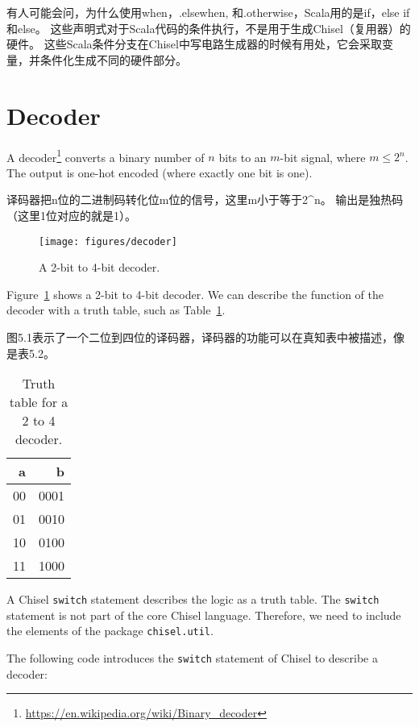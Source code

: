 \documentclass[%
    10pt,
    headinclude, footexclude,
    openright, %
    notitlepage,
    cleardoubleempty,
    headsepline,
    pointlessnumbers,
    bibtotoc, idxtotoc,
    ]{scrbook}
\newcommand{\code}[1]{{\small{\texttt{#1}}}}
\newcommand{\scale}{0.7}
\newcommand{\myref}[2]{\href{#1}{#2}}
\renewcommand{\myref}[2]{{#2}{\footnote{\url{#1}}}}
\begin{document}
有人可能会问，为什么使用when，.elsewhen, 和.otherwise，Scala用的是if，else if和else。
这些声明式对于Scala代码的条件执行，不是用于生成Chisel（复用器）的硬件。
这些Scala条件分支在Chisel中写电路生成器的时候有用处，它会采取变量，并条件化生成不同的硬件部分。


\section{Decoder}

A \myref{https://en.wikipedia.org/wiki/Binary_decoder}{decoder}
converts a binary number of $n$ bits to an $m$-bit signal, where $m \leq 2^n$.
The output is one-hot encoded (where exactly one bit is one).


译码器把n位的二进制码转化位m位的信号，这里m小于等于2^n。
输出是独热码（这里1位对应的就是1）。

\begin{figure}
  \centering
  \texttt{[image: figures/decoder]}
  \caption{A 2-bit to 4-bit decoder.}
  \label{fig:decoder}
\end{figure}

Figure~\ref{fig:decoder} shows a 2-bit to 4-bit decoder. We can describe the function
of the decoder with a truth table, such as Table~\ref{tab:decoder}.

图5.1表示了一个二位到四位的译码器，译码器的功能可以在真知表中被描述，像是表5.2。

\begin{table}
 \centering
 \label{tab:decoder}
  \begin{tabular}{rr}
    \toprule
    a & b \\
    \midrule
    00 & 0001 \\
    01 & 0010 \\
    10 & 0100 \\
    11 & 1000 \\
    \bottomrule 
  \end{tabular} 
  \caption{Truth table for a 2 to 4 decoder.}
\end{table}

A Chisel \code{switch} statement describes the logic as a truth table.
The \code{switch} statement is not part of the core Chisel language.
Therefore, we need to include the elements of the package \code{chisel.util}.


\noindent The following code introduces the \code{switch} statement of Chisel to describe a decoder:
\end{document}
